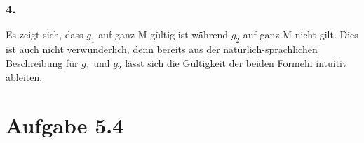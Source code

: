 \documentclass[12pt, paper=a4]{article}
\begin{document}
\subsubsection*{4.}
Es zeigt sich, dass $g_{1}$ auf ganz M gültig ist während $g_{2}$ auf ganz M nicht gilt.
Dies ist auch nicht verwunderlich, denn bereits aus der natürlich-sprachlichen Beschreibung für $g_{1}$ und $g_{2}$ lässt sich die Gültigkeit der beiden Formeln intuitiv ableiten.

\section*{Aufgabe 5.4}
\end{document}
